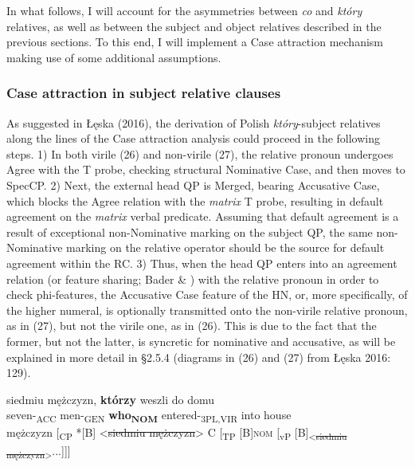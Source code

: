 \documentclass[output=paper]{langsci/langscibook}
\begin{document}
In what follows, I will account for the asymmetries between \textit{co} and \textit{który} relatives, as well as between the subject and object relatives described in the previous sections. To this end, I will implement a Case attraction mechanism making use of some additional assumptions.  

\subsubsection{Case attraction in subject relative clauses}%

As suggested in Łęska (2016), the derivation of Polish \textit{który}{}-subject relatives along the lines of the Case attraction analysis could proceed in the following steps. 1) In both virile (26) and non-virile (27), the relative pronoun undergoes Agree with the T probe, checking structural Nominative Case, and then moves to SpecCP. 2) Next, the external head QP is Merged, bearing Accusative Case, which blocks the Agree relation with the \textit{matrix} T probe, resulting in default agreement on the \textit{matrix} verbal predicate. Assuming that default agreement is a result of exceptional non-Nominative marking on the subject QP, the same non-Nominative marking on the relative operator should be the source for default agreement within the RC. 3) Thus, when the head QP enters into an agreement relation (or feature sharing; Bader \& \citealt{Bayer2006}) with the relative pronoun in order to check phi-features, the Accusative Case feature of the HN, or, more specifically, of the higher numeral, is optionally transmitted onto the non-virile relative pronoun, as in (27), but not the virile one, as in (26). This is due to the fact that the former, but not the latter, is syncretic for nominative and accusative, as will be explained in more detail in §2.5.4 (diagrams in (26) and (27) from Łęska 2016: 129).

\ea%
    \label{ex:leska:26}
    \gll siedmiu   mężczyzn,   \textbf{którzy}   weszli     do   domu\\
         seven-\textsubscript{ACC}   men-\textsubscript{GEN}   \textbf{who\textsubscript{NOM}}   entered-\textsubscript{3PL,VIR} into   house \\
    \glt {} mężczyzn [\textsubscript{CP} *[B] <\st{siedmiu mężczyzn}> C [\textsubscript{TP} [B]{\footnotesize\textsc{nom}} [\textsubscript{vP} [B]\textsubscript{<\st{siedmiu mężczyzn}>}...]]]
\z
\end{document}
